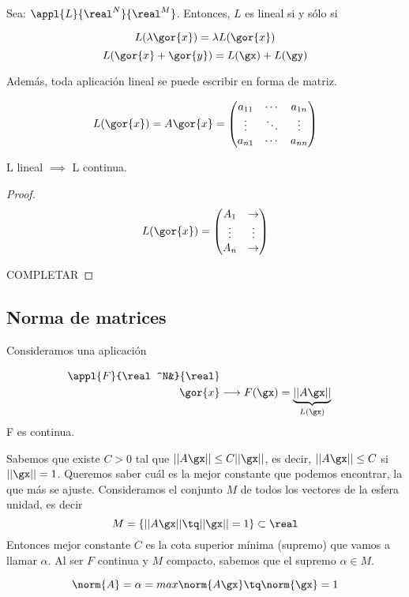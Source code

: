 \documentclass{apuntes}
\begin{document}
\begin{defn}

Sea: $\appl{L}{\real^N}{\real^M}$. Entonces, $L$ es lineal si y sólo si

\[ L(\lambda \gor{x}) = \lambda L(\gor{x}) \] 
\[ L(\gor{x}+\gor{y}) = L(\gx)+L(\gy)\] 

\end{defn}
Además, toda aplicación lineal se puede escribir en forma de matriz.

\[L(\gor{x})=A\gor{x} =
\begin{pmatrix}
a_{11} 	& \cdots & a_{1n}		\\
\vdots	& \ddots &  \vdots 	\\
a_{n1}	& \cdots & a_{nn} 
\end{pmatrix}\]

\begin{theorem}
 L lineal $\implies$ L continua.
\end{theorem}
\begin{proof}
 $$L(\gor{x}) = \left(
 \begin{matrix}
  A_1 & \rightarrow \\
  \vdots & \vdots\\
  A_n & \rightarrow
 \end{matrix}\right)$$
 
 COMPLETAR

\end{proof}
\subsection{Norma de matrices}
Consideramos una aplicación

\begin{align*}
\appl{F}{\real^N&}{\real} \\
\gor{x} &\longrightarrow F(\gx) = \underbrace{||A\gx||}_{L(\gx)}
\end{align*}F es continua.

Sabemos que existe $C>0$ tal que $||A\gx|| \leq C||\gx||$, es decir,  $||A\gx||\leq C$ si $||\gx||=1$. Queremos saber cuál es la mejor constante que podemos encontrar, la que más se ajuste. Consideramos el conjunto $M$ de todos los vectores de la esfera unidad, es decir 
$$M = \{||A\gx|| \tq ||\gx||=1\}\subset \real$$
Entonces mejor constante $C$ es la cota superior mínima (supremo) que vamos a llamar $\alpha$. Al ser $F$ continua y $M$ compacto, sabemos que el supremo $\alpha \in M$.

\begin{defn}
$$\norm{A} = \alpha = max{\norm{A\gx} \tq \norm{\gx} =1}$$
\end{defn}
\end{document}
